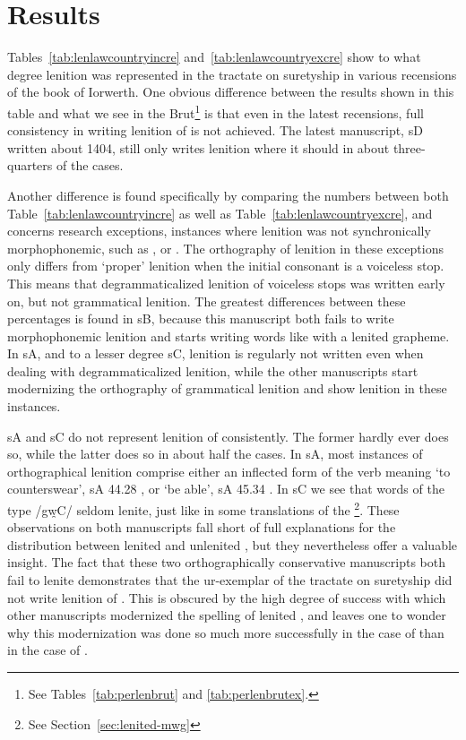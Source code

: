 \section{Results}
\label{sec:results}

Tables~\ref{tab:lenlawcountryincre} and~\ref{tab:lenlawcountryexcre} show to what degree lenition was represented in the tractate on suretyship in various recensions of the book of Iorwerth. One obvious difference between the results shown in this table and what we see in the Brut\footnote{See Tables~\ref{tab:perlenbrut} and \ref{tab:perlenbrutex}.} is that even in the latest recensions, full consistency in writing  lenition of  is not achieved. The latest manuscript, \gls{sD} written about 1404, still only writes lenition where it should in about three-quarters of the cases.

Another difference is found specifically by comparing the numbers between both Table~\ref{tab:lenlawcountryincre} as well as Table~\ref{tab:lenlawcountryexcre}, and concerns research exceptions, \ie instances where lenition was not synchronically morphophonemic, such as , or . The orthography of lenition in these exceptions only differs from `proper' lenition when the initial consonant is a voiceless stop. This means that degrammaticalized lenition of voiceless stops was written early on, but not grammatical lenition. The greatest differences between these percentages is found in \gls{sB}, because this manuscript both fails to write morphophonemic lenition and starts writing words like  with a lenited grapheme. In \gls{sA}, and to a lesser degree \gls{sC}, lenition is regularly not written even when dealing with degrammaticalized lenition, while the other manuscripts start modernizing the orthography of grammatical lenition and show lenition in these instances.

\Gls{sA} and \gls{sC} do not represent lenition of  consistently. The former hardly ever does so, while the latter does so in about half the cases. In \gls{sA}, most instances of orthographical lenition comprise either an inflected form of the verb meaning `to counterswear', \eg \gls{sA} 44.28 , or `be able', \eg \gls{sA} 45.34 . In \gls{sC} we see that words of the type /gw̯\gls{C}/ seldom lenite, just like in some translations of the \footnote{See Section~\ref{sec:lenited-mwg}}. These observations on both manuscripts fall short of full explanations for the distribution between lenited and unlenited , but they nevertheless offer a valuable insight. The fact that these two orthographically conservative manuscripts both fail to lenite  demonstrates that the ur-exemplar of the tractate on suretyship did not write lenition of . This is obscured by the high degree of success with which other manuscripts modernized the spelling of lenited , and leaves one to wonder why this modernization was done so much more successfully in the case of  than in the case of .

